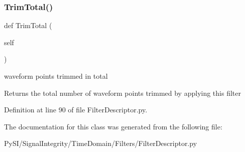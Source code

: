 \subsubsection{\texorpdfstring{Trim\+Total()}{TrimTotal()}}
{\footnotesize\ttfamily def Trim\+Total (\begin{DoxyParamCaption}\item[{}]{self }\end{DoxyParamCaption})}



waveform points trimmed in total 

\begin{DoxyReturn}{Returns}
the total number of waveform points trimmed by applying this filter 
\end{DoxyReturn}


Definition at line 90 of file Filter\+Descriptor.\+py.



The documentation for this class was generated from the following file\+:\begin{DoxyCompactItemize}
\item 
Py\+S\+I/\+Signal\+Integrity/\+Time\+Domain/\+Filters/Filter\+Descriptor.\+py\end{DoxyCompactItemize}
